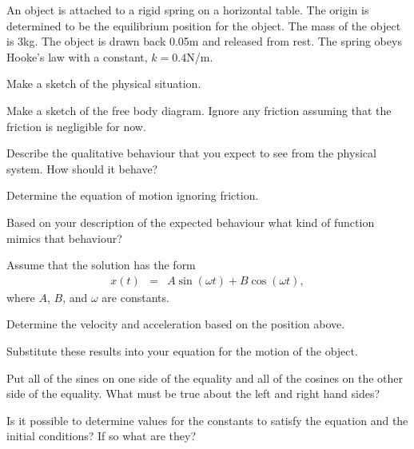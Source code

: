 \begin{problem}
\item An object is attached to a rigid spring on a horizontal
  table. The origin is determined to be the equilibrium position for
  the object. The mass of the object is 3kg. The object is drawn back
  0.05m and released from rest. The spring obeys Hooke's law with a
  constant, $k=0.4$N/m.
  \begin{subproblem}
    \item Make a sketch of the physical situation.
      \vfill
    \item Make a sketch of the free body diagram. Ignore any friction
      assuming that the friction is negligible for now.
      \vfill
    \item Describe the qualitative behaviour that you expect to see
      from the physical system. How should it behave?
      \vfill
    \item Determine the equation of motion ignoring friction.
      \vfill

      \clearpage

    \item Based on your description of the expected behaviour what
      kind of function mimics that behaviour?
      \vspace{3em}

    \item Assume that the solution has the form
      \begin{eqnarray*}
        x(t) & = & A \sin(\omega t) + B \cos(\omega t),
      \end{eqnarray*}
      where $A$, $B$, and $\omega$ are constants. 
      \begin{subproblem}
      \item Determine the velocity and acceleration based on the
        position above.  
        \vfill
      \item Substitute these results into your equation for the motion
        of the object.
        \vfill
        \clearpage
      \item Put all of the sines on one side of the equality and all
        of the cosines on the other side of the equality. What must be
        true about the left and right hand sides?
        \vspace{6em}
      \item Is it possible to determine values for the constants to
        satisfy the equation and the initial conditions? If so what
        are they?
        \vfill
      \end{subproblem}

  \end{subproblem}
\end{problem}

